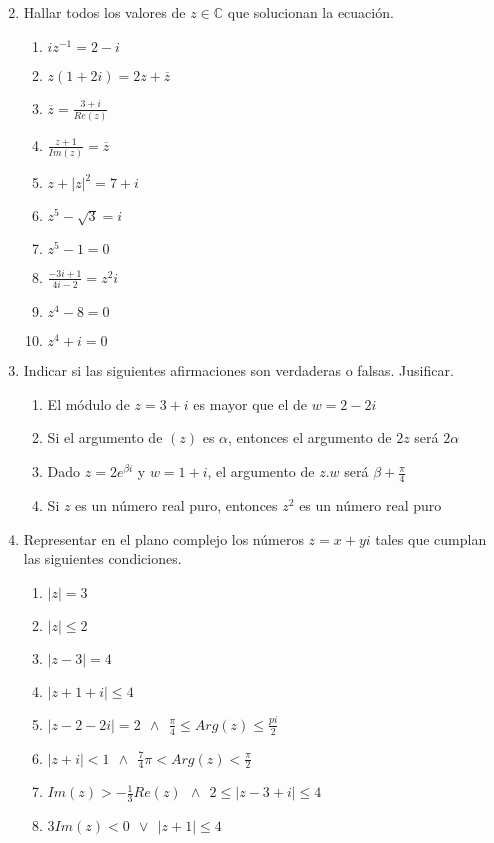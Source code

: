 \documentclass[a4paper]{article}
\newcommand{\exercise}{\item}
\newcommand{\df}[2]{\displaystyle\frac{#1}{#2}}
\newcommand{\conj}[1]{\overline{#1}}
\begin{document}
\begin{enumerate}
\begin{multicols}{2}
	\end{multicols}
	\exercise Hallar todos los valores de $z \in \mathbb{C}$ que solucionan la ecuación.
	\begin{multicols}{2}
	\begin{enumerate} [label=(\alph*)]
		\item $iz^{-1}=2-i$
		\item $z(1+2i)=2z+\conj{z}$
		\item $\conj{z}=\df{3+i}{Re(z)}$
		\item $\df{z+1}{Im(z)}=\conj{z}$
		\item $z+|z|^2=7+i$
		\item $z^5-\sqrt{3}=i$
		\item $z^5-1=0$
		\item $\df{-3i+1}{4i-2}=z^2i$
		\item $z^4-8=0$
		\item $z^4+i=0$
	\end{enumerate}
	\end{multicols}
	\exercise Indicar si las siguientes afirmaciones son verdaderas o falsas. Jusificar.
	\begin{enumerate} [label=(\alph*)]
		\item El módulo de $z=3+i$ es mayor que el de $w=2-2i$
		\item Si el argumento de $(z)$ es $\alpha$, entonces el argumento de $2z$ será $2\alpha$ 
		\item Dado $z=2e^{\beta i}$ y $w=1+i$, el argumento de $z.w$ será $\beta+\df{\pi}{4}$
		\item Si $z$ es un número real puro, entonces $z^2$ es un número real puro
	\end{enumerate}
	\exercise Representar en el plano complejo los números $z=x+yi$ tales que cumplan las siguientes condiciones.
	\begin{multicols}{2}
	\begin{enumerate} [label=(\alph*)]
		\item $|z|=3$
		\item $|z|\leq 2$
		\item $|z-3| = 4$
		\item $|z+1+i| \leq 4$
		\item $|z-2-2i|=2 ~~\land~~ \df{\pi}{4} \leq Arg(z) \leq \df{pi}{2}$
		\item $|z+i|<1 ~~\land~~ \df{7}{4}\pi < Arg(z) < \df{\pi}{2}$
		\item $Im(z)> -\df{1}{3}Re(z) ~~\land~~ 2 \leq |z-3+i| \leq 4$
		\item $3Im(z)<0 ~~\lor~~ |z+1| \leq 4$

\end{enumerate}
\end{multicols}
\end{enumerate}
\end{document}
